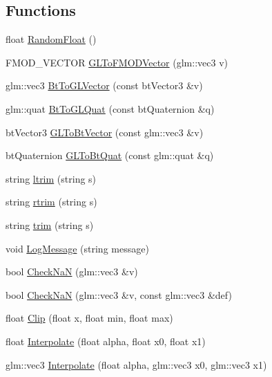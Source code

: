 \subsection*{Functions}
\begin{DoxyCompactItemize}
\item 
float \hyperlink{namespace_b_g_e_adc7c9e5cd854fcfc95dc113829de71ec}{Random\-Float} ()
\item 
F\-M\-O\-D\-\_\-\-V\-E\-C\-T\-O\-R \hyperlink{namespace_b_g_e_a1176d21c3f2c245052b152aa77826f60}{G\-L\-To\-F\-M\-O\-D\-Vector} (glm\-::vec3 v)
\item 
glm\-::vec3 \hyperlink{namespace_b_g_e_a7164f364e9eec84829d0ea2206731895}{Bt\-To\-G\-L\-Vector} (const bt\-Vector3 \&v)
\item 
glm\-::quat \hyperlink{namespace_b_g_e_aa9f49a8e2cec4d7811398f243475abbf}{Bt\-To\-G\-L\-Quat} (const bt\-Quaternion \&q)
\item 
bt\-Vector3 \hyperlink{namespace_b_g_e_a721a46c8618bcd3b8a72138f45211e10}{G\-L\-To\-Bt\-Vector} (const glm\-::vec3 \&v)
\item 
bt\-Quaternion \hyperlink{namespace_b_g_e_a57f8f67a5520cfbe967e4f91f02138e9}{G\-L\-To\-Bt\-Quat} (const glm\-::quat \&q)
\item 
string \hyperlink{namespace_b_g_e_ab0424dbb7fe523b80f6b0263b1d2fe5f}{ltrim} (string s)
\item 
string \hyperlink{namespace_b_g_e_a2485e47315736fd27e76f03a0d3c66ec}{rtrim} (string s)
\item 
string \hyperlink{namespace_b_g_e_a65bfe22b3a4b03bf32837ac39a8a6aaf}{trim} (string s)
\item 
void \hyperlink{namespace_b_g_e_a04062588c9f02e8fda67f52bb349162d}{Log\-Message} (string message)
\item 
bool \hyperlink{namespace_b_g_e_a3e44220909ce0c540f52ec4eba240e10}{Check\-Na\-N} (glm\-::vec3 \&v)
\item 
bool \hyperlink{namespace_b_g_e_aca61b9423894ceed2b7ba003836ef673}{Check\-Na\-N} (glm\-::vec3 \&v, const glm\-::vec3 \&def)
\item 
float \hyperlink{namespace_b_g_e_ad302842b2584198d7cffd196c3cf3c15}{Clip} (float x, float min, float max)
\item 
float \hyperlink{namespace_b_g_e_ac7f736b1f8b80d3785ebaeae03ba4e26}{Interpolate} (float alpha, float x0, float x1)
\item 
glm\-::vec3 \hyperlink{namespace_b_g_e_a5264a82c63751d1c66f83f5c2d364b53}{Interpolate} (float alpha, glm\-::vec3 x0, glm\-::vec3 x1)

\end{DoxyCompactItemize}
